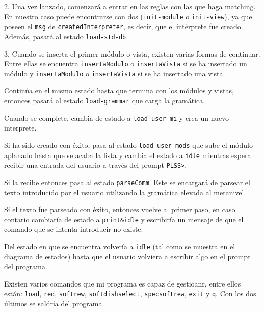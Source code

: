 2. Una vez lanzado, comenzará a entrar en las reglas con las que haga matching. En nuestro caso puede encontrarse con dos (\texttt{init-module} o \texttt{init-view}), ya que poseen el \texttt{msg} de \texttt{createdInterpreter}, es decir, que el intérprete fue creado. Además, pasará al estado \texttt{load-std-db}.  

3. Cuando se inserta el primer módulo o vista, existen varias formas de continuar. Entre ellas se encuentra \texttt{insertaModulo} o \texttt{insertaVista} si se ha insertado un módulo y \texttt{insertaModulo} o \texttt{insertaVista} si se ha insertado una vista.

Continúa en el mismo estado hasta que termina con los módulos y vistas, entonces pasará al estado \texttt{load-grammar} que carga la gramática.

Cuando se complete, cambia de estado a \texttt{load-user-mi} y crea un nuevo interprete.

Si ha sido creado con éxito, pasa al estado \texttt{load-user-mods} que sube el módulo aplanado hasta que se acaba la lista y cambia el estado a \texttt{idle} mientras espera recibir una entrada del usuario a través del prompt \texttt{PLSS>}.

Si la recibe entonces pasa al estado \texttt{parseComm}. Este se encargará de parsear el texto introducido por el usuario utilizando la gramática elevada al metanivel.

Si el texto fue parseado con éxito, entonces vuelve al primer paso, en caso contario cambiaría de estado a \texttt{print\&idle} y escribiría un mensaje de que el comando que se intenta introducir no existe.

Del estado en que se encuentra volvería a \texttt{idle} (tal como se muestra en el diagrama de estados) hasta que el usuario volviera a escribir algo en el prompt del programa.

Existen varios comandos que mi programa es capaz de gestioanr, entre ellos están: \texttt{load}, \texttt{red}, \texttt{softrew}, \texttt{softdishselect}, \texttt{specsoftrew}, \texttt{exit} y \texttt{q}. Con los dos últimos se saldría del programa.
\medskip




